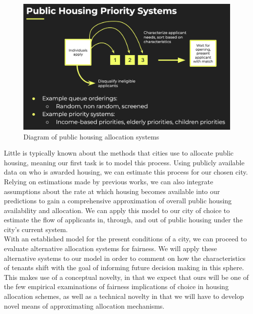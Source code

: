\documentclass[11pt]{article}
\begin{document}
\begin{figure}
    \centering
    \includegraphics[width=0.75\linewidth]{schematic_priority _systems.png}
    \caption{Diagram of public housing allocation systems}
    \label{fig:schematic}
\end{figure}
\newline
Little is typically known about the methods that cities use to allocate public housing, meaning our first task is to model this process. Using publicly available data on who is awarded housing, we can estimate this process for our chosen city. Relying on estimations made by previous works, we can also integrate assumptions about the rate at which housing becomes available into our predictions to gain a comprehensive approximation of overall public housing availability and allocation. We can apply this model to our city of choice to estimate the flow of applicants in, through, and out of public housing under the city's current system. \\
\newline
With an established model for the present conditions of a city, we can proceed to evaluate alternative allocation systems for fairness. We will apply these alternative systems to our model in order to comment on how the characteristics of tenants shift with the goal of informing future decision making in this sphere. This makes use of a conceptual novelty, in that we expect that ours will be one of the few empirical examinations of fairness implications of choice in housing allocation schemes, as well as a technical novelty in that we will have to develop novel means of approximating allocation mechanisms.
\end{document}
